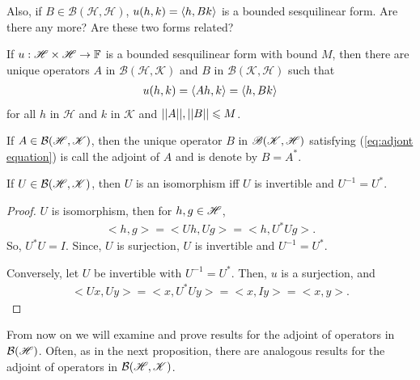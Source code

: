 Also, if $B\in \mathcal{B}(\mathscr{H},\mathscr{H})$, 
$u(h, k) = \langle h,Bk\rangle$ is a bounded sesquilinear form. 
Are there any more? Are these two forms related?

\begin{theorem}{}{}
    If $u:\mathscr{H}\times\mathscr{H}\rightarrow \mathbb{F}$ is a bounded sesquilinear form with bound $M$, 
    then there are unique operators $A$ in $\mathscr{B}(\mathscr{H},\mathscr{K})$ and $B$ in $\mathscr{B}(\mathscr{K},\mathscr{H})$
    such that 
    \begin{align}
        u(h,k) = \langle Ah,k\rangle=\langle h,Bk\rangle
        \label{eq:adjont equation}
    \end{align}
    for all $h$ in $\mathscr{H}$ and $k$ in $\mathscr{K}$ and $||A||,||B||\leqslant M$. 
\end{theorem}

\begin{proofsolution}
    
    
\end{proofsolution}


\begin{definition}{}{}
    If $A\in \mathcal{B}(\mathscr{H},\mathscr{K})$, then the unique operator $B$ in $\mathscr{B}(\mathscr{K},\mathscr{H})$ satisfying (\ref{eq:adjont equation})
    is call the adjoint of $A$ and is denote by $B=A^*$.
\end{definition}

\begin{proposition}{}{}
    If $U\in \mathcal{B}(\mathscr{H},\mathscr{K})$, then $U$ is an isomorphism iff $U$ is invertible and $U^{-1}=U^*$.
\end{proposition}

\begin{proof}
    $U$ is isomorphism, then for $h,g\in \mathscr{H}$, 
    \begin{align*}
        <h,g>=<Uh,Ug> = <h,U^*Ug>.
    \end{align*} 
    So, $U^*U=I$. Since, $U$ is surjection, $U$ is invertible and $U^{-1}=U^*$.

    Conversely, let $U$ be invertible with $U^{-1}=U^*$. Then, $u$ is a surjection, and 
    \begin{align*}
        <Ux,Uy> = <x,U^*Uy>=<x,Iy>=<x,y>.
    \end{align*}
\end{proof}

From now on we will examine and prove results for the adjoint of operators 
in $\mathcal{B}(\mathscr{H})$. Often, as in the next proposition, there are analogous results for 
the adjoint of operators in $\mathcal{B}(\mathscr{H},\mathscr{K})$.

